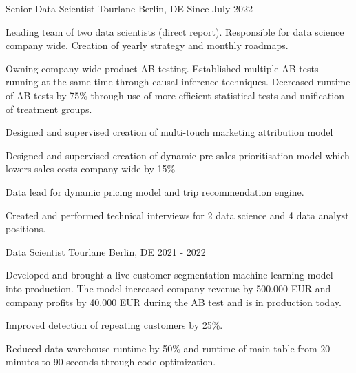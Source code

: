 \begin{section}[Experience]
  \entry%
    {Senior Data Scientist} %
    {Tourlane} %
    {Berlin, DE} %
    {Since July 2022} %
    {%
    \begin{entrylist}
      \item Leading team of two data scientists (direct report). Responsible for data science company wide. Creation of yearly strategy and monthly roadmaps.
      \item Owning company wide product AB testing. Established multiple AB tests running at the same time through causal inference techniques. Decreased runtime of AB tests by 75\% through use of more efficient statistical tests and unification of treatment groups.
      \item Designed and supervised creation of multi-touch marketing attribution model
      \item Designed and supervised creation of dynamic pre-sales prioritisation model which lowers sales costs company wide by 15\%
      \item Data lead for dynamic pricing model and trip recommendation engine.
      \item Created and performed technical interviews for 2 data science and 4 data analyst positions.
    \end{entrylist}
    }%

  \entry%
    {Data Scientist} %
    {Tourlane} %
    {Berlin, DE} %
    {2021 - 2022} %
    {%
    \begin{entrylist}
      \item Developed and brought a live customer segmentation machine learning model into production. The model increased company revenue by 500.000 EUR and company profits by 40.000 EUR during the AB test and is in production today.
      \item Improved detection of repeating customers by 25\%.
      \item Reduced data warehouse runtime by 50\% and runtime of main table from 20 minutes to 90 seconds through code optimization.
    \end{entrylist}
    }%

\end{section}


